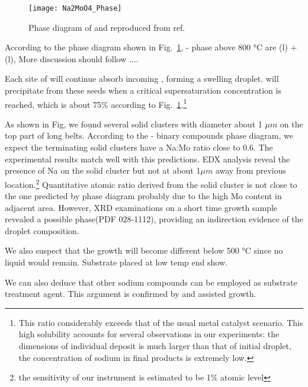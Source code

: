 \begin{figure}[htb]
\centering
\texttt{[image: Na2MoO4\_Phase]}
\caption[Phase diagram of Na-Mo-O]{Phase diagram of  and  reproduced from ref.~\cite{Hoermann1929}}
\label{fig:pd}
\end{figure}

According to the phase diagram shown in Fig.~\ref{fig:pd},  -  phase above 800 \si{\degreeCelsius} are (l) + (l), More discussion should follow $\ldots$.

Each site of  will continue absorb incoming , forming a swelling droplet.  will precipitate from these seeds when a critical supersaturation concentration is reached, which is about 75\% according to Fig.~\ref{fig:pd}.\footnote{This ratio considerably exceeds that of the usual metal catalyst scenario. This high solubility accounts for several observations in our experiments: the dimensions of individual deposit is much larger than that of initial droplet, the concentration of sodium in final products is extremely low.}

As shown in Fig, we found several solid clusters with diameter about 1 $\mu m$ on the top part of long belts. According to the - binary compounds phase diagram, we expect the terminating solid clusters have a Na:Mo ratio close to 0.6. The experimental results match well with this predictions. EDX analysis reveal the presence of Na on the solid cluster but not at about 1$\mu m$ away from previous location.\footnote{the sensitivity of our instrument is estimated to be 1\% atomic level} Quantitative atomic ratio derived from the solid cluster is not close to the one predicted by phase diagram probably due to the high Mo content in adjacent area. However, XRD examinations on a short time growth sample revealed a possible  phase(PDF 028-1112), providing an indirection evidence of the droplet composition.

We also suspect that the growth will become different below 500 \si{\degreeCelsius} since no liquid would remain. Substrate placed at low temp end show.

We can also deduce that other sodium compounds can be employed as substrate treatment agent. This argument is confirmed by  and  assisted growth.


